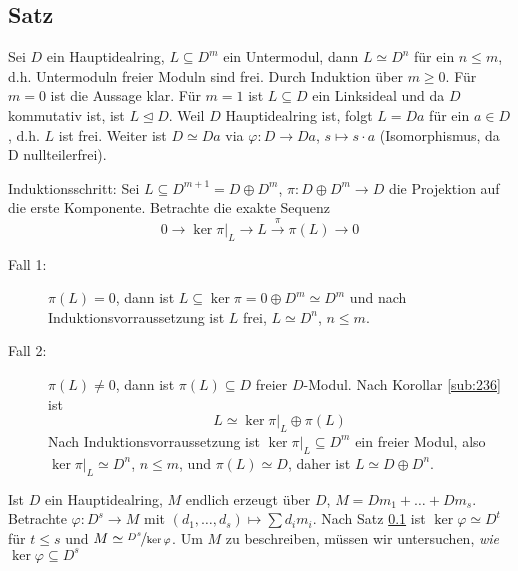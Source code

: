 \subsection[Satz: Für $R$ HIR sind Untermoduln freier $R$-Moduln frei]{Satz} %
\label{sub:242}
Sei $D$ ein Hauptidealring, $L \subseteq D^m$ ein Untermodul, dann $L \simeq D^n$ für ein $n \le m$, d.h. Untermoduln freier Moduln sind frei.
Durch Induktion über $m \ge 0$. Für $m=0$ ist die Aussage klar. Für $m=1$ ist $L \subseteq D$ ein Linksideal und da $D$ kommutativ ist, ist $L \unlhd D$. Weil $D$
Hauptidealring ist, folgt $L=D a$ für ein $a \in D$, d.h. $L$ ist frei. Weiter ist $D \simeq D a$ via $\varphi : D \to D a$, $s \mapsto s \cdot a$ (Isomorphismus, da D
nullteilerfrei).

Induktionsschritt: Sei $L \subseteq D^{m+1} = D \oplus D^m$, $\pi  : D \oplus D^m \to D$ die Projektion auf die erste Komponente. Betrachte die exakte Sequenz
\[
	0 \to \ker \pi\big|_L \to L \xrightarrow{\pi} \pi(L) \to 0 
\]
\begin{description}
	\item[Fall 1:] $\pi (L)=0$, dann ist $L \subseteq \ker \pi = 0 \oplus D^m \simeq D^m$ und nach Induktionsvorraussetzung ist $L$ frei, $L \simeq D^n$, $n \le m$.
	\item[Fall 2:] $\pi (L) \not= 0$, dann ist $\pi(L) \subseteq D$ freier $D$-Modul. Nach Korollar \ref{sub:236} ist 
	\[
		L \simeq \ker \pi\big|_L \oplus \pi(L)
	\]
	Nach Induktionsvorraussetzung ist $\ker \pi\big|_L \subseteq D^m$ ein freier Modul, also $\ker \pi\big|_L \simeq D^n$, $n \le m$, und $\pi (L) \simeq D$, daher ist 
	$L \simeq D \oplus D^n$. \bewende
\end{description}
	Ist $D$ ein Hauptidealring, $M$ endlich erzeugt über $D$, $M = D m_1 + \ldots + D m_s$. Betrachte $\varphi : D^s \to M$ mit $(d_1, \ldots , d_s) \mapsto \sum d_i m_i$.
	Nach Satz \ref{sub:242} ist $\ker \varphi \simeq D^t$ für $t \le s$ und $M \simeq \nicefrac{D^s}{\ker \varphi}$. Um $M$ zu beschreiben, müssen wir untersuchen, 
	\emph{wie} $\ker \varphi \subseteq D^s$

